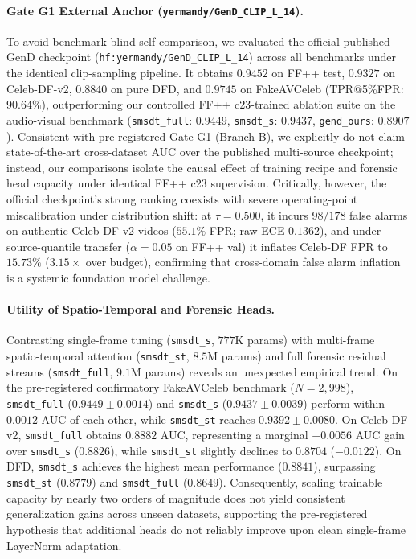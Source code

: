 \paragraph{Gate G1 External Anchor (\texttt{yermandy/GenD\_CLIP\_L\_14}).}
To avoid benchmark-blind self-comparison, we evaluated the official published GenD checkpoint (\texttt{hf:yermandy/GenD\_CLIP\_L\_14}) across all benchmarks under the identical clip-sampling pipeline. It obtains $0.9452$ on FF++ test, $0.9327$ on Celeb-DF-v2, $0.8840$ on pure DFD, and $\mathbf{0.9745}$ on FakeAVCeleb (TPR@5\%FPR: $90.64\%$), outperforming our controlled FF++ c23-trained ablation suite on the audio-visual benchmark (\texttt{smsdt\_full}: $0.9449$, \texttt{smsdt\_s}: $0.9437$, \texttt{gend\_ours}: $0.8907$). Consistent with pre-registered Gate G1 (Branch B), we explicitly do not claim state-of-the-art cross-dataset AUC over the published multi-source checkpoint; instead, our comparisons isolate the causal effect of training recipe and forensic head capacity under identical FF++ c23 supervision. Critically, however, the official checkpoint's strong ranking coexists with severe operating-point miscalibration under distribution shift: at $\tau = 0.500$, it incurs $98/178$ false alarms on authentic Celeb-DF-v2 videos ($55.1\%$ FPR; raw ECE $0.1362$), and under source-quantile transfer ($\alpha=0.05$ on FF++ val) it inflates Celeb-DF FPR to $15.73\%$ ($3.15\times$ over budget), confirming that cross-domain false alarm inflation is a systemic foundation model challenge.

\paragraph{Utility of Spatio-Temporal and Forensic Heads.}
Contrasting single-frame tuning (\texttt{smsdt\_s}, $777\text{K}$ params) with multi-frame spatio-temporal attention (\texttt{smsdt\_st}, $8.5\text{M}$ params) and full forensic residual streams (\texttt{smsdt\_full}, $9.1\text{M}$ params) reveals an unexpected empirical trend. On the pre-registered confirmatory FakeAVCeleb benchmark ($N=2{,}998$), \texttt{smsdt\_full} ($0.9449 \pm 0.0014$) and \texttt{smsdt\_s} ($0.9437 \pm 0.0039$) perform within $0.0012$ AUC of each other, while \texttt{smsdt\_st} reaches $0.9392 \pm 0.0080$. On Celeb-DF v2, \texttt{smsdt\_full} obtains $0.8882$ AUC, representing a marginal $+0.0056$ AUC gain over \texttt{smsdt\_s} ($0.8826$), while \texttt{smsdt\_st} slightly declines to $0.8704$ ($-0.0122$). On DFD, \texttt{smsdt\_s} achieves the highest mean performance ($0.8841$), surpassing \texttt{smsdt\_st} ($0.8779$) and \texttt{smsdt\_full} ($0.8649$). Consequently, scaling trainable capacity by nearly two orders of magnitude does not yield consistent generalization gains across unseen datasets, supporting the pre-registered hypothesis that additional heads do not reliably improve upon clean single-frame LayerNorm adaptation.


